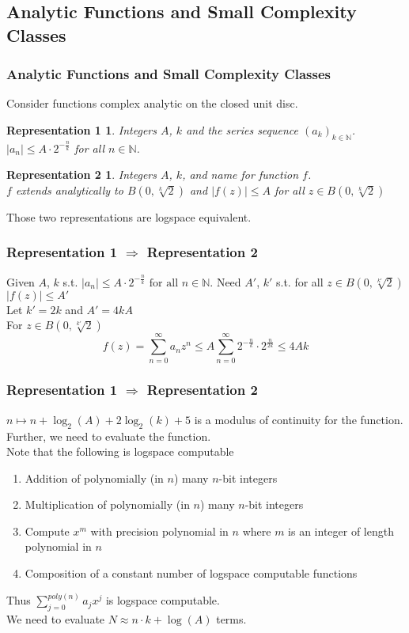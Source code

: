 \documentclass[xcolor=pdftex,dvipsnames,table]{beamer}
\newcommand{\N}{\ensuremath{\mathbb{N}}}
\newcommand{\abs}[1]{\left|#1\right|}
\newtheorem{representation1}{Representation 1}
\newtheorem{representation2}{Representation 2}
\begin{document}
\subsection{Analytic Functions and Small Complexity Classes}
\begin{frame}
\frametitle{Analytic Functions and Small Complexity Classes}
  Consider functions complex analytic on the closed unit disc.
\begin{representation1}
  Integers $A$, $k$ and the series sequence $(a_k)_{k \in \N}$.\\
  $\abs{a_n} \leq A \cdot 2^{-\frac{n}{k}}$ for all $n \in \N$.
\end{representation1}
\begin{representation2}
  Integers $A$, $k$, and name for function $f$.\\
  $f$ extends analytically to $B(0, \sqrt[k]{2})$ and $\abs{f(z)} \leq A$ for all $z \in B(0, \sqrt[k]{2})$
\end{representation2}
Those two representations are logspace equivalent.
\end{frame}
\begin{frame}
\frametitle{Representation 1 $\Rightarrow$ Representation 2}
Given $A$, $k$ s.t. 
  $\abs{a_n} \leq A \cdot 2^{-\frac{n}{k}} \text{ for all } n \in \N.$
Need $A'$, $k'$ s.t. for all $z \in B(0, \sqrt[k']{2})$
$\abs{f(z)} \leq A'$\\
\vfill
\pause
Let $k' = 2k$ and $A' = 4kA$ \\
For $z \in B(0, \sqrt[k']{2})$
$$f(z) = \sum_{n=0}^\infty a_nz^n \leq A\sum_{n=0}^\infty 2^{-\frac{n}{k}} \cdot 2^{\frac{n}{2k}} \leq 4Ak$$
\end{frame}
\begin{frame}
\frametitle{Representation 1 $\Rightarrow$ Representation 2}
$n \mapsto n+\log_2(A)+2\log_2(k)+5$ is a modulus of continuity for the function.\\
\pause
Further, we need to evaluate the function.\\
Note that the following is logspace computable 
\begin{enumerate}[<+->]
\item Addition of polynomially (in $n$) many $n$-bit integers
\item Multiplication of polynomially (in $n$) many $n$-bit integers
\item Compute $x^m$ with precision polynomial in $n$ where $m$ is an integer of length polynomial in $n$
 \item Composition of a constant number of logspace computable functions
\end{enumerate}
\pause
Thus $\sum_{j=0}^{poly(n)} a_jx^j$ is logspace computable.\\
We need to evaluate $N \approx n \cdot k + \log(A)$ terms.
\end{frame}
\end{document}
